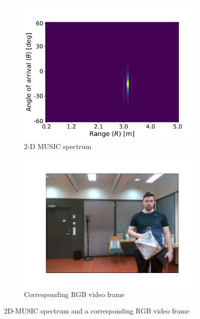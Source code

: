 \begin{figure}
    \centering
    \begin{subfigure}[b]{0.49\textwidth}
        \centering
        \includegraphics[width=\textwidth]{fig/4/music_spectrum.pdf}
        \caption{2-D MUSIC spectrum}
    \end{subfigure}
    \hfill
    \begin{subfigure}[b]{0.49\textwidth}
        \centering
        \includegraphics[width=\textwidth]{fig/4/music_corresponding_rgb_image.pdf}
        \caption{Corresponding RGB video frame}
    \end{subfigure}
    \caption{2D-MUSIC spectrum and a corresponding RGB video frame}
    \label{fig:2d-music-example}
\end{figure}

